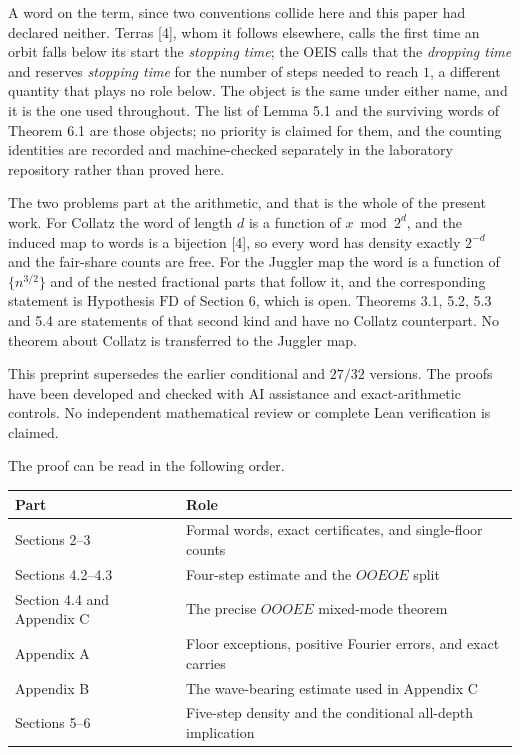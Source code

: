 \documentclass[11pt,a4paper]{article}
\begin{document}
A word on the term, since two conventions collide here and this paper
had declared neither. Terras {[}4{]}, whom it follows elsewhere, calls
the first time an orbit falls below its start the \emph{stopping time};
the OEIS calls that the \emph{dropping time} and reserves \emph{stopping
time} for the number of steps needed to reach \(1\), a different
quantity that plays no role below. The object is the same under either
name, and it is the one used throughout. The list of Lemma 5.1 and the
surviving words of Theorem 6.1 are those objects; no priority is claimed
for them, and the counting identities are recorded and machine-checked
separately in the laboratory repository rather than proved here.

The two problems part at the arithmetic, and that is the whole of the
present work. For Collatz the word of length \(d\) is a function of
\(x\bmod2^d\), and the induced map to words is a bijection {[}4{]}, so
every word has density exactly \(2^{-d}\) and the fair-share counts are
free. For the Juggler map the word is a function of \(\{n^{3/2}\}\) and
of the nested fractional parts that follow it, and the corresponding
statement is Hypothesis \(\mathrm{FD}\) of Section 6, which is open.
Theorems 3.1, 5.2, 5.3 and 5.4 are statements of that second kind and
have no Collatz counterpart. No theorem about Collatz is transferred to
the Juggler map.

This preprint supersedes the earlier conditional and \(27/32\) versions.
The proofs have been developed and checked with AI assistance and
exact-arithmetic controls. No independent mathematical review or
complete Lean verification is claimed.

The proof can be read in the following order.

\begingroup\small

\begin{longtable}[]{@{}
  >{\raggedright\arraybackslash}p{}
  >{\raggedright\arraybackslash}p{}@{}}
\toprule\noalign{}
\begin{minipage}[b]{\linewidth}\raggedright
Part
\end{minipage} & \begin{minipage}[b]{\linewidth}\raggedright
Role
\end{minipage} \\
\midrule\noalign{}
\endhead
\bottomrule\noalign{}
\endlastfoot
Sections 2--3 & Formal words, exact certificates, and single-floor
counts \\
Sections 4.2--4.3 & Four-step estimate and the \(OOEOE\) split \\
Section 4.4 and Appendix C & The precise \(OOOEE\) mixed-mode theorem \\
Appendix A & Floor exceptions, positive Fourier errors, and exact
carries \\
Appendix B & The wave-bearing estimate used in Appendix C \\
Sections 5--6 & Five-step density and the conditional all-depth
implication \\
\end{longtable}
\end{document}
